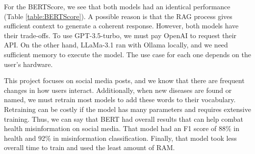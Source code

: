 For the BERTScore, we see that both models had an identical performance (Table \ref{table:BERTScore}). A possible reason is that the RAG process gives sufficient context to generate a coherent response. However, both models
have their trade-offs. To use GPT-3.5-turbo, we must pay OpenAI to request their API. On the other hand, LLaMa-3.1 ran with Ollama locally, and we need sufficient memory to execute the model. The
use case for each one depends on the user's hardware.

This project focuses on social media posts, and we know that there are frequent changes in how users interact. Additionally, when new diseases are found or named, we must retrain most
models to add these words to their vocabulary. Retraining can be costly if the model has many parameters and requires extensive training. Thus, we can say that BERT had overall results
that can help combat health misinformation on social media. That model had an F1 score of 88\% in health and 92\% in misinformation classification. Finally, that model took less overall time
to train and used the least amount of RAM.




